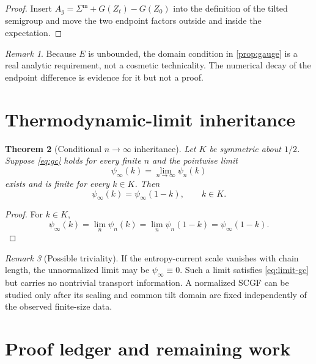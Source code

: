 \documentclass[11pt]{article}
\newtheorem{theorem}{Theorem}[section]
\theoremstyle{remark}
\newtheorem{remark}[theorem]{Remark}
\newcommand{\SigmaM}{\Sigma^{\mathrm m}}
\begin{document}
\begin{proof}
Insert $A_g=\SigmaM+G(Z_t)-G(Z_0)$ into the definition of the tilted
semigroup and move the two endpoint factors outside and inside the expectation.
\end{proof}

\begin{remark}
Because $E$ is unbounded, the domain condition in \cref{prop:gauge} is a real
analytic requirement, not a cosmetic technicality.  The numerical decay of
the endpoint difference is evidence for it but not a proof.
\end{remark}

\section{Thermodynamic-limit inheritance}

\begin{theorem}[Conditional $n\to\infty$ inheritance]\label{thm:limit}
Let $K$ be symmetric about $1/2$.  Suppose \eqref{eq:gc} holds for every
finite $n$ and the pointwise limit
\begin{equation}\label{eq:limit}
 \psi_\infty(k)=\lim_{n\to\infty}\psi_n(k)
\end{equation}
exists and is finite for every $k\in K$.  Then
\begin{equation}\label{eq:limit-gc}
 \psi_\infty(k)=\psi_\infty(1-k),\qquad k\in K.
\end{equation}
\end{theorem}

\begin{proof}
For $k\in K$,
\[
 \psi_\infty(k)=\lim_n\psi_n(k)
 =\lim_n\psi_n(1-k)=\psi_\infty(1-k).
\]
\end{proof}

\begin{remark}[Possible triviality]
If the entropy-current scale vanishes with chain length, the unnormalized
limit may be $\psi_\infty\equiv0$.  Such a limit satisfies
\eqref{eq:limit-gc} but carries no nontrivial transport information.  A
normalized SCGF can be studied only after its scaling and common tilt domain
are fixed independently of the observed finite-size data.
\end{remark}

\section{Proof ledger and remaining work}
\end{document}
